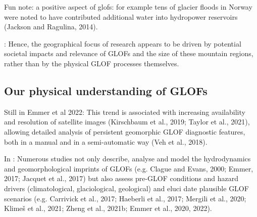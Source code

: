 Fun note: a positive aspect of glofs: for example tens of glacier floods in Norway were noted to have contributed
additional water into hydropower reservoirs (Jackson and
Ragulina, 2014).

\cite{Emmer&al2022}: Hence, the geographical focus of research appears to be driven by potential societal impacts and relevance of GLOFs and the size of these mountain regions, rather than by the physical GLOF processes themselves.




\subsection{Our physical understanding of GLOFs}







Still in Emmer et al 2022: This trend is associated with increasing availability and resolution of satellite images (Kirschbaum et al., 2019; Taylor et al., 2021), allowing detailed analysis of persistent geomorphic GLOF diagnostic features, both in a manual and in a semi-automatic way (Veh et al., 2018).

In \cite{Emmer&al2022}: Numerous studies not only describe, analyse and model the hydrodynamics and geomorphological imprints of GLOFs (e.g. Clague and Evans, 2000; Emmer, 2017; Jacquet et al., 2017) but also assess pre-GLOF conditions and hazard drivers (climatological, glaciological, geological) and eluci date plausible GLOF scenarios (e.g. Carrivick et al., 2017; Haeberli et al., 2017; Mergili et al., 2020; Klimeš et al., 2021; Zheng et al., 2021b; Emmer et al., 2020, 2022).

